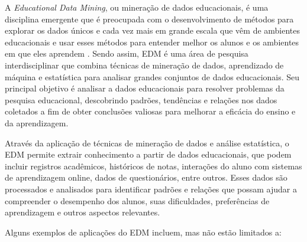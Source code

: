 A \textit{Educational Data Mining}, ou mineração de dados educacionais, é uma disciplina emergente que é preocupada com o desenvolvimento de métodos para explorar os dados únicos e cada vez mais em grande escala que vêm de ambientes educacionais e usar esses métodos para entender melhor os alunos e os ambientes em que eles aprendem \cite{Egitim:2017}. Sendo assim, EDM é uma área de pesquisa interdisciplinar que combina técnicas de mineração de dados, aprendizado de máquina e estatística para analisar grandes conjuntos de dados educacionais. Seu principal objetivo é analisar a dados educacionais para resolver problemas da pesquisa educacional, descobrindo padrões, tendências e relações nos dados coletados a fim de obter conclusões valiosas para melhorar a eficácia do ensino e da aprendizagem.

Através da aplicação de técnicas de mineração de dados e análise estatística, o EDM permite extrair conhecimento a partir de dados educacionais, que podem incluir registros acadêmicos, históricos de notas, interações do aluno com sistemas de aprendizagem online, dados de questionários, entre outros. Esses dados são processados e analisados para identificar padrões e relações que possam ajudar a compreender o desempenho dos alunos, suas dificuldades, preferências de aprendizagem e outros aspectos relevantes.

Alguns exemplos de aplicações do EDM incluem, mas não estão limitados a:

